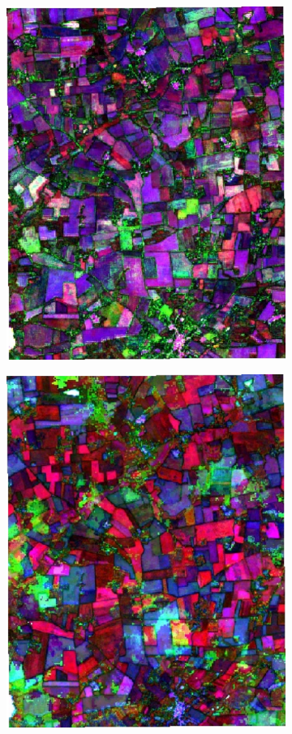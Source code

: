 \documentclass[journal,article,submit,pdftex,moreauthors]{Definitions/mdpi}
\begin{document}
\begin{figure}[H]
\begin{subfigure}[t]{0.23\linewidth}
	\caption{}
	\label{fig:color_map_b}
	\end{subfigure}
	\begin{subfigure}[t]{0.23\linewidth}
		\centering
	  \includegraphics[height=\linewidth,width=0.95\linewidth]{figures/aes_1_layer_mse_results/composites/composite_image_598481.pdf}
	\caption{}
	\label{fig:color_map_c}
	\end{subfigure}
	\begin{subfigure}[t]{0.23\linewidth}
		\centering
	\includegraphics[height=\linewidth,width=0.95\linewidth]{figures/aes_1_layer_mse_results/composites/composite_image_3011141.pdf}

\end{subfigure}
\end{figure}
\end{document}

